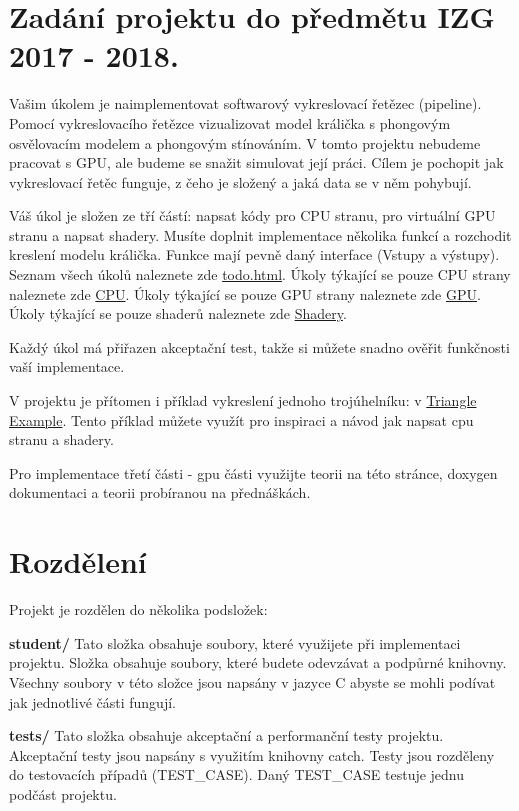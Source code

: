 \hypertarget{index_zadani}{}\section{Zadání projektu do předmětu I\-Z\-G 2017 -\/ 2018.}\label{index_zadani}


Vašim úkolem je naimplementovat softwarový vykreslovací řetězec (pipeline). Pomocí vykreslovacího řetězce vizualizovat model králička s phongovým osvělovacím modelem a phongovým stínováním. V tomto projektu nebudeme pracovat s G\-P\-U, ale budeme se snažit simulovat její práci. Cílem je pochopit jak vykreslovací řetěc funguje, z čeho je složený a jaká data se v něm pohybují.

Váš úkol je složen ze tří částí\-: napsat kódy pro C\-P\-U stranu, pro virtuální G\-P\-U stranu a napsat shadery. Musíte doplnit implementace několika funkcí a rozchodit kreslení modelu králička. Funkce mají pevně daný interface (Vstupy a výstupy). Seznam všech úkolů naleznete zde \hyperlink{todo}{todo.\-html}. Úkoly týkající se pouze C\-P\-U strany naleznete zde \hyperlink{group__cpu__side}{C\-P\-U}. Úkoly týkající se pouze G\-P\-U strany naleznete zde \hyperlink{group__gpu__side}{G\-P\-U}. Úkoly týkající se pouze shaderů naleznete zde \hyperlink{group__shader__side}{Shadery}.

Každý úkol má přiřazen akceptační test, takže si můžete snadno ověřit funkčnosti vaší implementace.

V projektu je přítomen i příklad vykreslení jednoho trojúhelníku\-: v \hyperlink{TriangleExample-example}{Triangle Example}. Tento příklad můžete využít pro inspiraci a návod jak napsat cpu stranu a shadery.

Pro implementace třetí části -\/ gpu části využijte teorii na této stránce, doxygen dokumentaci a teorii probíranou na přednáškách.\hypertarget{index_rozdeleni}{}\section{Rozdělení}\label{index_rozdeleni}
Projekt je rozdělen do několika podsložek\-:

{\bfseries student/} Tato složka obsahuje soubory, které využijete při implementaci projektu. Složka obsahuje soubory, které budete odevzávat a podpůrné knihovny. Všechny soubory v této složce jsou napsány v jazyce C abyste se mohli podívat jak jednotlivé části fungují.

{\bfseries tests/} Tato složka obsahuje akceptační a performanční testy projektu. Akceptační testy jsou napsány s využitím knihovny catch. Testy jsou rozděleny do testovacích případů (T\-E\-S\-T\-\_\-\-C\-A\-S\-E). Daný T\-E\-S\-T\-\_\-\-C\-A\-S\-E testuje jednu podčást projektu.

